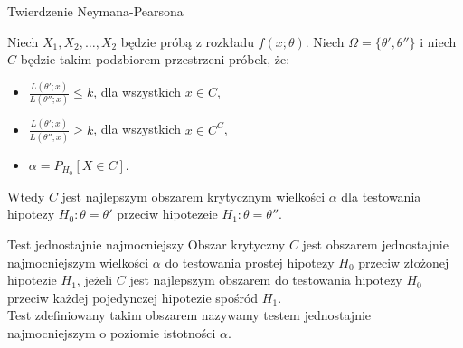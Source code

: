 \documentclass[avery5371, grid, frame]{flashcards}
\begin{document}
\begin{flashcard}[Twierdzenie]{Twierdzenie Neymana-Pearsona}
\begin{small}
    Niech $X_1, X_2, \dots, X_2$ będzie próbą z rozkładu $f(x; \theta)$. Niech $\Omega = \{\theta', \theta''\}$ i niech $C$ będzie takim podzbiorem przestrzeni próbek, że:\
    \begin{itemize}
        \item $\frac{L(\theta'; x)}{L(\theta''; x)} \leq k$, dla wszystkich $x \in C$,
        \item $\frac{L(\theta'; x)}{L(\theta''; x)} \geq k$, dla wszystkich $x \in C^C$,
        \item $\alpha = P_{H_0}[X \in C]$.
    \end{itemize}
    Wtedy $C$ jest najlepszym obszarem krytycznym wielkości $\alpha$ dla testowania hipotezy $H_0: \theta = \theta'$ przeciw hipotezeie $H_1: \theta = \theta''$.
\end{small}
\end{flashcard}

\begin{flashcard}[Definicja]{Test jednostajnie najmocniejszy}
    Obszar krytyczny $C$ jest obszarem jednostajnie najmocniejszym wielkości $\alpha$ do testowania prostej hipotezy $H_0$ przeciw złożonej hipotezie $H_1$, jeżeli $C$ jest najlepszym obszarem do testowania hipotezy $H_0$ przeciw każdej pojedynczej hipotezie spośród $H_1$. \\
    Test zdefiniowany takim obszarem nazywamy testem jednostajnie najmocniejszym o poziomie istotności $\alpha$.
\end{flashcard}
\end{document}

